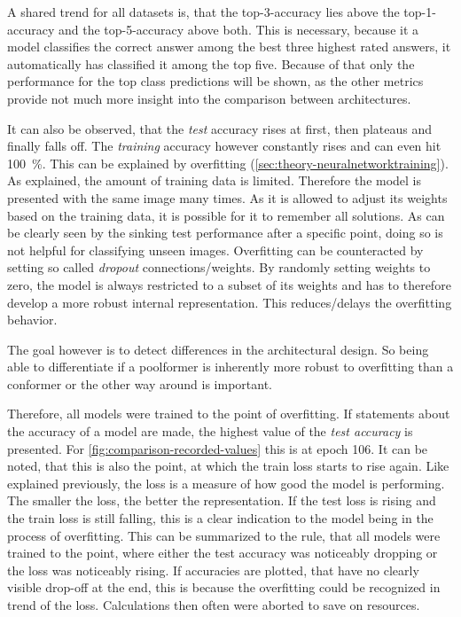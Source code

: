 A shared trend for all datasets is, that the top-3-accuracy lies above the top-1-accuracy and the top-5-accuracy above both. 
This is necessary, because it a model classifies the correct answer among the best three highest rated answers, it automatically has classified it among the top five. 
Because of that only the performance for the top class predictions will be shown, as the other metrics provide not much more insight into the comparison between architectures.

It can also be observed, that the \emph{test} accuracy rises at first, then plateaus and finally falls off.
The \emph{training} accuracy however constantly rises and can even hit \SI[]{100}[]{\percent}.
This can be explained by overfitting (\autoref{sec:theory-neuralnetworktraining}).
As explained, the amount of training data is limited. 
Therefore the model is presented with the same image many times. 
As it is allowed to adjust its weights based on the training data, it is possible for it to \glqq remember\grqq{} all solutions.
As can be clearly seen by the sinking test performance after a specific point, doing so is not helpful for classifying unseen images.
Overfitting can be counteracted by setting so called \emph{dropout} connections/weights.
By randomly setting weights to zero, the model is always restricted to a subset of its weights and has to therefore develop a more robust internal representation. This reduces/delays the overfitting behavior.

The goal however is to detect differences in the architectural design. 
So being able to differentiate if a poolformer is inherently more robust to overfitting than a conformer or the other way around is important. 

Therefore, all models were trained to the point of overfitting. 
If statements about the accuracy of a model are made, the highest value of the \emph{test accuracy} is presented.
For \autoref{fig:comparison-recorded-values} this is at epoch 106.
It can be noted, that this is also the point, at which the train loss starts to rise again.
Like explained previously, the loss is a measure of how good the model is performing. 
The smaller the loss, the better the representation. 
If the test loss is rising and the train loss is still falling, this is a clear indication to the model being in the process of overfitting. 
This can be summarized to the rule, that all models were trained to the point, where either the test accuracy was noticeably dropping or the loss was noticeably rising.
If accuracies are plotted, that have no clearly visible drop-off at the end, this is because the overfitting could be recognized in trend of the loss. 
Calculations then often were aborted to save on resources.

